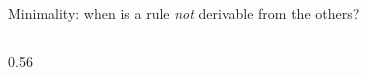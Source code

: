 \begin{frame}{Minimality: when is a rule \emph{not} derivable from the others? \New}
\begin{columns}[c]
\begin{column}{0.56\textwidth}
\begin{code}
%
\\[\AgdaEmptyExtraSkip]%
%
\>[2]\AgdaSpace{}%
\AgdaSymbol{:}\AgdaSpace{}%
\AgdaSymbol{(}\AgdaSpace{}%
\AgdaSymbol{:}\AgdaSpace{}%
\AgdaSpace{}%
\AgdaSymbol{)}\AgdaSpace{}%
\AgdaSpace{}%
\AgdaSpace{}%
\AgdaSpace{}%
\AgdaSpace{}%
\AgdaSpace{}%
\<%
\\
%
\>[2]\AgdaSymbol{(}\AgdaSpace{}%
\AgdaSpace{}%
\AgdaSymbol{)}\AgdaSpace{}%
\AgdaSpace{}%
\AgdaSpace{}%
\AgdaSymbol{=}\AgdaSpace{}%
\AgdaSpace{}%
\AgdaSymbol{(}\AgdaSpace{}%
\AgdaSpace{}%
\AgdaSymbol{)}\AgdaSpace{}%
\<%
\end{code}
\begin{code}[hide]%
%
\>[2]\<%
\\
\>[2][@{}l@{\AgdaIndent{0}}]%
\>[4]\AgdaSpace{}%
\AgdaSymbol{:}\AgdaSpace{}%
\AgdaSpace{}%
\AgdaSymbol{(}\AgdaSpace{}%
\AgdaSymbol{:}\AgdaSpace{}%
\AgdaSpace{}%
\AgdaSymbol{)}\AgdaSpace{}%
\AgdaSymbol{(}\AgdaSpace{}%
\AgdaSymbol{:}\AgdaSpace{}%
\AgdaSpace{}%
\AgdaSymbol{)}\AgdaSpace{}%
\AgdaSymbol{\{}\AgdaSpace{}%
\AgdaSymbol{\}}\AgdaSpace{}%
\AgdaSpace{}%
\AgdaSpace{}%
\AgdaSpace{}%
\AgdaSpace{}%
\AgdaSpace{}%
\<%
\\
%
\>[2]\AgdaSpace{}%
\AgdaSpace{}%
\AgdaSymbol{(}\AgdaSpace{}%
\AgdaSymbol{:}\AgdaSpace{}%
\AgdaSpace{}%
\AgdaSymbol{)}\AgdaSpace{}%
\AgdaSymbol{(}\AgdaSpace{}%
\AgdaSymbol{:}\AgdaSpace{}%
\AgdaSpace{}%
\AgdaSymbol{)}\AgdaSpace{}%
\AgdaSymbol{(}\AgdaSpace{}%
\AgdaSymbol{:}\AgdaSpace{}%
\AgdaSpace{}%
\AgdaSpace{}%
\AgdaSymbol{)}\AgdaSpace{}%
\AgdaSymbol{(}\AgdaSpace{}%
\AgdaSymbol{:}\AgdaSpace{}%
\AgdaSpace{}%
\AgdaSpace{}%
\AgdaSpace{}%
\AgdaSymbol{)}\AgdaSpace{}%

\end{code}
\end{column}
\end{columns}
\end{frame}

